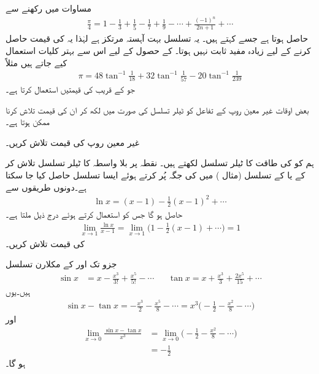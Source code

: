 مساوات  میں رکھنے سے
\begin{align*}
\frac{\pi}{4}=1-\frac{1}{3}+\frac{1}{5}-\frac{1}{7}+\frac{1}{9}-\cdots+\frac{(-1)^n}{2n+1}+\cdots
\end{align*}
حاصل ہوتا ہے جسے  کہتے ہیں۔ یہ تسلسل بہت آہستہ مرتکز ہے لہٰذا یہ  کی قیمت حاصل کرنے کے لیے زیادہ مفید ثابت نہیں ہوتا۔  کے حصول کے لیے اس سے بہتر کلیات استعمال کیے جاتے ہیں مثلاً
\begin{align*}
\pi=48\tan^{-1}\frac{1}{18}+32\tan^{-1}\frac{1}{57}-20\tan^{-1}\frac{1}{239}
\end{align*}
جو  کے قریب  کی قیمتیں استعمال کرتا ہے۔ 

بعض اوقات غیر معین روپ کے تفاعل کو  ٹیلر تسلسل کی صورت میں لکھ کر ان کی قیمت تلاش کرنا ممکن ہوتا ہے۔

غیر معین روپ  کی قیمت تلاش کریں۔

ہم  کو  کی طاقت کا ٹیلر تسلسل لکھتے ہیں۔  نقطہ  پر بلا واسطہ  کا ٹیلر تسلسل  تلاش کر کے یا  کے تسلسل (مثال ) میں  کی جگہ  پُر کرتے ہوئے ایسا تسلسل حاصل کیا جا سکتا ہے۔دونوں طریقوں سے
\begin{align*}
\ln x=(x-1)-\frac{1}{2}(x-1)^2+\cdots
\end{align*}
حاصل ہو گا جس کو استعمال کرتے ہوئے درج ذیل ملتا ہے۔
\begin{align*}
\lim_{x\to 1}\frac{\ln x}{x-1}=\lim_{x\to 1}\big(1-\frac{1}{2}(x-1)+\cdots \big)=1
\end{align*}
 کی قیمت تلاش کریں۔

جزو  تک   اور  کے مکلارن تسلسل 
\begin{align*}
\sin x&=x-\frac{x^3}{3!}+\frac{x^5}{5!}-\cdots&& \tan x=x+\frac{x^3}{3}+\frac{2x^5}{15}+\cdots
\end{align*}
ہیں۔یوں
\begin{align*}
\sin x-\tan x=-\frac{x^3}{2}-\frac{x^5}{8}-\cdots=x^3\big(-\frac{1}{2}-\frac{x^2}{8}-\cdots\big)
\end{align*}
اور
\begin{align*}
\lim_{x\to 0}\frac{\sin x-\tan x}{x^3}&=\lim_{x\to 0}\big(-\frac{1}{2}-\frac{x^2}{8}-\cdots\big)\\
&=-\frac{1}{2}
\end{align*}
ہو گا۔

